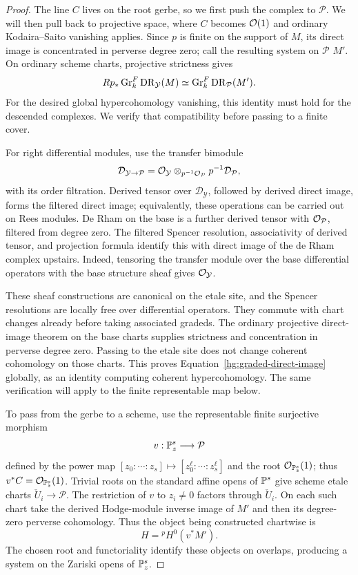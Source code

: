 \begin{proof}
The line \(C\) lives on the root gerbe, so we first push the
complex to \(\mathcal P\).  We will then pull back to projective
space, where \(C\) becomes \(\mathcal{O}(1)\) and ordinary
Kodaira--Saito vanishing applies.  Since \(p\) is finite on the
support of \(M\), its direct image is concentrated in perverse
degree zero; call the resulting system on \(\mathcal P\) \(M'\).
On ordinary scheme
charts, projective strictness gives
\begin{equation}\label{hg:graded-direct-image}
 Rp_*\operatorname{Gr}^F_k\operatorname{DR}_{\mathcal Y}(M)
 \simeq \operatorname{Gr}^F_k\operatorname{DR}_{\mathcal P}(M').
\end{equation}
For the desired global hypercohomology vanishing, this identity must
hold for the descended complexes.  We verify that compatibility
before passing to a finite cover.

For right differential modules, use the transfer bimodule
\[
 \mathcal D_{\mathcal Y\to\mathcal P}
 =
 \mathcal{O}_{\mathcal Y}\otimes_{p^{-1}\mathcal{O}_{\mathcal P}}
                         p^{-1}\mathcal D_{\mathcal P},
\]
with its order filtration.  Derived tensor over
\(\mathcal D_{\mathcal Y}\), followed by derived direct image,
forms the filtered direct image; equivalently, these operations
can be carried out on Rees modules.  De Rham on the base is a
further derived tensor with \(\mathcal{O}_{\mathcal P}\), filtered from
degree zero.  The filtered Spencer resolution, associativity of
derived tensor, and projection formula identify this with direct
image of the de Rham complex upstairs.  Indeed, tensoring the
transfer module over the base differential operators with the
base structure sheaf gives \(\mathcal{O}_{\mathcal Y}\).

These sheaf constructions are canonical on the etale site, and the
Spencer resolutions are locally free over differential operators.
They commute with chart changes already before taking associated
gradeds.  The ordinary projective direct-image theorem on the base
charts supplies strictness and concentration in perverse degree
zero.  Passing to the etale site does not change coherent
cohomology on those charts.  This proves
Equation~\eqref{hg:graded-direct-image} globally, as an identity
computing coherent hypercohomology.  The same verification will
apply to the finite representable map below.

To pass from the gerbe to a scheme, use the representable finite
surjective morphism
\[
 v:\mathbb{P}^s_z\longrightarrow\mathcal P
\]
defined by the power map
\([z_0:\cdots:z_s]\mapsto[z_0^\ell:\cdots:z_s^\ell]\)
and the root \(\mathcal{O}_{\mathbb{P}^s_z}(1)\); thus
\(v^*C=\mathcal{O}_{\mathbb{P}^s_z}(1)\).  Trivial roots on the standard affine
opens of \(\mathbb{P}^s\) give scheme etale charts
\(\check U_i\to\mathcal P\).  The restriction of \(v\) to
\(z_i\ne0\) factors through \(\check U_i\).  On each such
chart take the derived Hodge-module inverse image of \(M'\)
and then its degree-zero perverse cohomology.  Thus the object
being constructed chartwise is
\[
 H={}^pH^0(v^*M').
\]
The chosen root and functoriality identify these objects on
overlaps, producing a system on the Zariski opens of \(\mathbb{P}^s_z\).


\end{proof}
